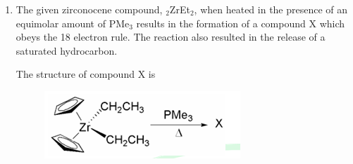 \documentclass[journal,12pt,onecolumn]{IEEEtran}
\theoremstyle{remark}
\begin{document}
\begin{enumerate}
\item The given zirconocene compound, $_{2}$ZrEt$_{2}$, when heated in the presence of an equimolar amount of PMe$_{3}$ results in the formation of a compound X which obeys the 18 electron rule. The reaction also resulted in the release of a saturated hydrocarbon.


The structure of compound X is
 \begin{figure}[H]
        \centering
        \includegraphics[width=0.4\columnwidth]{figs/q38.png}
        \caption*{}
        \label{fig:placeholder}
    \end{figure}
    \begin{enumerate}
    \end{enumerate}      \hfill{}




\end{enumerate}
\end{document}
